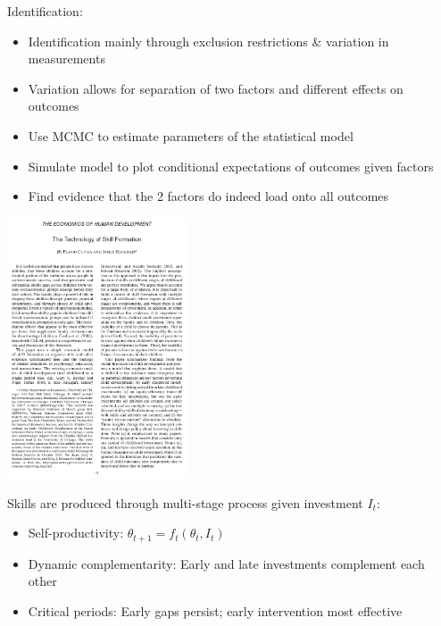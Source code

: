 \documentclass[aspectratio=169]{beamer}
\begin{document}
\begin{frame}
Identification:
\bigskip\par
\begin{itemize}
\itemsep1.5em
    \item<2-> Identification mainly through exclusion restrictions \& variation in measurements
    \item<3-> Variation allows for separation of two factors and different effects on outcomes
\end{itemize}
\bigskip

\begin{itemize}
\itemsep1.5em
    \item<5-> Use MCMC to estimate parameters of the statistical model
\end{itemize}
\bigskip

\begin{itemize}
\itemsep1.5em
    \item<7-> Simulate model to plot conditional expectations of outcomes given factors
    \item<8-> Find evidence that the 2 factors do indeed load onto all outcomes
\end{itemize}

\end{frame}


\begin{frame}
\centering
\includegraphics[width=0.4\textwidth]{Cunha_Heckman_2007_AER_cover.jpg}
\end{frame}

\begin{frame}
Skills are produced through multi-stage process given investment $I_t$:
\bigskip

\begin{itemize}
\itemsep1.5em
\item<2-> Self-productivity: $\theta_{t+1} = f_t(\theta_t, I_t)$ 
\item<3-> Dynamic complementarity: Early and late investments complement each other
\item<4-> Critical periods: Early gaps persist; early intervention most effective
\end{itemize}

\bigskip
{}
\end{frame}
\end{document}
